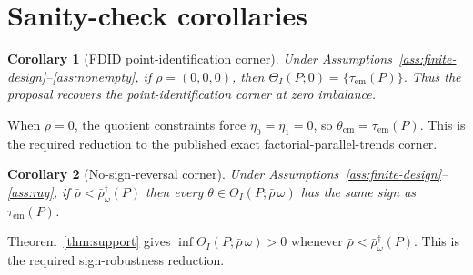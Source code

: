 \documentclass[11pt]{article}
\theoremstyle{definition}
\theoremstyle{plain}
\newtheorem{corollary}{Corollary}
\theoremstyle{remark}
\begin{document}
\section{Sanity-check corollaries}
\begin{corollary}[FDID point-identification corner]\label{cor:fdid-corner}
Under Assumptions~\ref{ass:finite-design}--\ref{ass:nonempty}, if \(\rho=(0,0,0)\), then \(\Theta_I(P;0)=\{\tau_{\mathrm{em}}(P)\}\). Thus the proposal recovers the \citet{XuZhaoDing2026FDID} point-identification corner at zero imbalance.
\end{corollary}
When \(\rho=0\), the quotient constraints force \(\eta_0=\eta_1=0\), so \(\theta_{\mathrm{cm}}=\tau_{\mathrm{em}}(P)\). This is the required reduction to the published exact factorial-parallel-trends corner.

\begin{corollary}[No-sign-reversal corner]\label{cor:no-reversal}
Under Assumptions~\ref{ass:finite-design}--\ref{ass:ray}, if \(\bar\rho<\bar\rho^\dagger_\omega(P)\) then every \(\theta\in\Theta_I(P;\bar\rho\,\omega)\) has the same sign as \(\tau_{\mathrm{em}}(P)\).
\end{corollary}
Theorem~\ref{thm:support} gives \(\inf\Theta_I(P;\bar\rho\,\omega)>0\) whenever \(\bar\rho<\bar\rho^\dagger_\omega(P)\). This is the required sign-robustness reduction.
\end{document}
